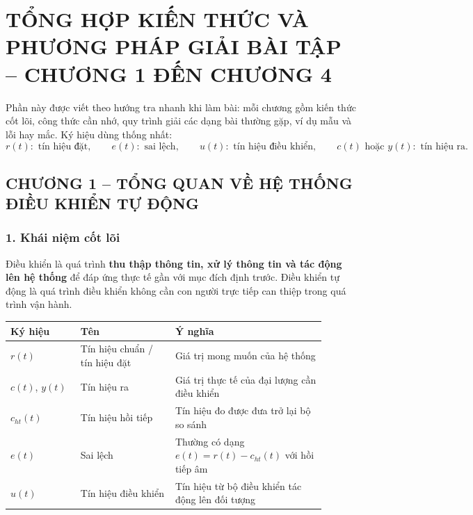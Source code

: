 %   

\providecommand{\Lap}{\mathcal{L}}
\providecommand{\dd}{\,\mathrm{d}}
\providecommand{\e}{\mathrm{e}}

\clearpage
\section*{TỔNG HỢP KIẾN THỨC VÀ PHƯƠNG PHÁP GIẢI BÀI TẬP -- CHƯƠNG 1 ĐẾN CHƯƠNG 4}

\noindent
Phần này được viết theo hướng tra nhanh khi làm bài: mỗi chương gồm kiến thức cốt lõi,
công thức cần nhớ, quy trình giải các dạng bài thường gặp, ví dụ mẫu và lỗi hay mắc.
Ký hiệu dùng thống nhất:
\[
r(t):\text{ tín hiệu đặt},\qquad
e(t):\text{ sai lệch},\qquad
u(t):\text{ tín hiệu điều khiển},\qquad
c(t)\text{ hoặc }y(t):\text{ tín hiệu ra}.
\]

\subsection*{CHƯƠNG 1 -- TỔNG QUAN VỀ HỆ THỐNG ĐIỀU KHIỂN TỰ ĐỘNG}

\subsubsection*{1. Khái niệm cốt lõi}

Điều khiển là quá trình \textbf{thu thập thông tin, xử lý thông tin và tác động lên hệ thống}
để đáp ứng thực tế gần với mục đích định trước. Điều khiển tự động là quá trình điều khiển
không cần con người trực tiếp can thiệp trong quá trình vận hành.

\begin{center}
\begin{tabular}{|p{0.20\linewidth}|p{0.27\linewidth}|p{0.43\linewidth}|}
\hline
\textbf{Ký hiệu} & \textbf{Tên} & \textbf{Ý nghĩa} \\ \hline
$r(t)$ & Tín hiệu chuẩn / tín hiệu đặt & Giá trị mong muốn của hệ thống \\ \hline
$c(t)$, $y(t)$ & Tín hiệu ra & Giá trị thực tế của đại lượng cần điều khiển \\ \hline
$c_{ht}(t)$ & Tín hiệu hồi tiếp & Tín hiệu đo được đưa trở lại bộ so sánh \\ \hline
$e(t)$ & Sai lệch & Thường có dạng $e(t)=r(t)-c_{ht}(t)$ với hồi tiếp âm \\ \hline
$u(t)$ & Tín hiệu điều khiển & Tín hiệu từ bộ điều khiển tác động lên đối tượng \\ \hline
\end{tabular}
\end{center}

